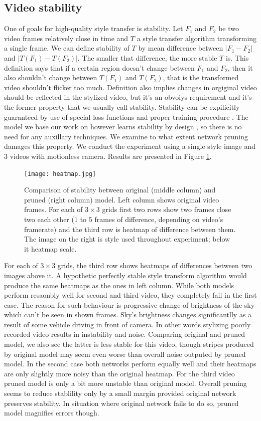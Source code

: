 \documentclass[../Main.tex]{subfiles}
\begin{document}
\subsection{Video stability}
One of goals for high-quality style transfer is stability. Let $F_1$ and $F_2$ be 
two video frames relatively close in time and $T$ a style transfer algorithm transforming
a single frame. We can define stability of $T$ by mean difference between
$| F_1 - F_2 |$ and $|T(F_1)-T(F_2)|$. The smaller that difference, the more stable $T$ is.
This definition says that if a certain region doesn't change between $F_1$ and $F_2$, then
it also shouldn't change between $T(F_1)$ and $T(F_2)$, that is the transformed video
shouldn't flicker too much. Definition also implies changes in orgiginal video
should be reflected in the stylized video, but it's an obvoiys requirement and it's
the former property that we usually call stability.
Stability can be expilicitly guaranteed by use of special loss functions
and proper training procedure \cite{stability1, stability2}. The model we base our work
on however learns stability by design \cite{Li2018}, so there is no need for
any auxillary techniques. We examine to what extent network pruning damages this 
property. We conduct the experiment using a single style image and 3 videos with motionless
camera. Results are presented in Figure \ref{fig:heatmap}.

\begin{figure}[h!]
\centering
    \texttt{[image: heatmap.jpg]}
    \caption{Comparison of stability between original (middle column) and pruned
    (right column) model. Left column shows original video frames. For each of
    $3\times3$ grids first two rows show two frames close two each other
    ($1$ to $5$ frames of difference, depending on video's framerate) and the third
    row is heatmap of difference between them. The image on the right is style used
    throughout experiment; below it heatmap scale.
    }
    \label{fig:heatmap}
\end{figure} 

For each of $3\times3$ grids, the third row shows heatmaps of differences between 
two images above it. A hypothetic perfectly stable style transform algorithm would
produce the same heatmaps as the ones in left column. While both models perform
resaonbly well for second and third video, they completely fail in the first case.
The reason for such behaviour is progressive change of brightness of the sky
which can't be seen in shown frames. Sky's brightness changes significantlly 
as a result of some vehicle driving in front of camera. In other words
stylizing poorly recorded video results in instability and noise. Comparing
original and pruned model, we also see the latter is less stable for this video,
though stripes produced by original model may seem even worse than overall
noise outputed by pruned model. In the second case both networks perform equally well
and their heatmaps are only slightly more noisy than the original heatmap.
For the third video pruned model is only a bit more unstable than original model.
Overall pruning seems to reduce stablility only by a small margin provided original network
preserves stability. In situation where original network fails to do so, pruned model
magnifies errors though.
\end{document}
